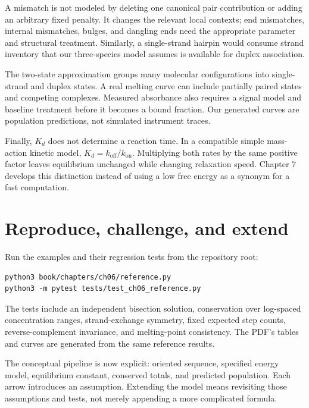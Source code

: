 A mismatch is not modeled by deleting one canonical pair contribution or
adding an arbitrary fixed penalty. It changes the relevant local contexts;
end mismatches, internal mismatches, bulges, and dangling ends need the
appropriate parameter and structural treatment. Similarly, a single-strand
hairpin would consume strand inventory that our three-species model assumes
is available for duplex association.

The two-state approximation groups many molecular configurations into
single-strand and duplex states. A real melting curve can include partially
paired states and competing complexes. Measured absorbance also requires
a signal model and baseline treatment before it becomes a bound fraction.
Our generated curves are population predictions, not simulated instrument traces.

Finally, $K_d$ does not determine a reaction time. In a compatible simple
mass-action kinetic model, $K_d=k_{\mathrm{off}}/k_{\mathrm{on}}$.
Multiplying both rates by the same positive factor leaves equilibrium
unchanged while changing relaxation speed. Chapter 7 develops this distinction
instead of using a low free energy as a synonym for a fast computation.

\section{Reproduce, challenge, and extend}

Run the examples and their regression tests from the repository root:
\begin{Verbatim}[fontsize=\small]
python3 book/chapters/ch06/reference.py
python3 -m pytest tests/test_ch06_reference.py
\end{Verbatim}
The tests include an independent bisection solution, conservation over
log-spaced concentration ranges, strand-exchange symmetry, fixed expected
step counts, reverse-complement invariance, and melting-point consistency.
The PDF's tables and curves are generated from the same reference results.

The conceptual pipeline is now explicit: oriented sequence, specified
energy model, equilibrium constant, conserved totals, and predicted population.
Each arrow introduces an assumption. Extending the model means revisiting
those assumptions and tests, not merely appending a more complicated formula.

